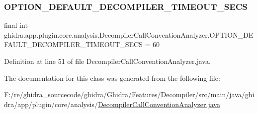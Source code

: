 \subsubsection{\texorpdfstring{OPTION\_DEFAULT\_DECOMPILER\_TIMEOUT\_SECS}{OPTION\_DEFAULT\_DECOMPILER\_TIMEOUT\_SECS}}
{\footnotesize\ttfamily final int ghidra.\+app.\+plugin.\+core.\+analysis.\+Decompiler\+Call\+Convention\+Analyzer.\+O\+P\+T\+I\+O\+N\+\_\+\+D\+E\+F\+A\+U\+L\+T\+\_\+\+D\+E\+C\+O\+M\+P\+I\+L\+E\+R\+\_\+\+T\+I\+M\+E\+O\+U\+T\+\_\+\+S\+E\+CS = 60\hspace{0.3cm}{\ttfamily [static]}}



Definition at line 51 of file Decompiler\+Call\+Convention\+Analyzer.\+java.



The documentation for this class was generated from the following file\+:\begin{DoxyCompactItemize}
\item 
F\+:/re/ghidra\+\_\+sourcecode/ghidra/\+Ghidra/\+Features/\+Decompiler/src/main/java/ghidra/app/plugin/core/analysis/\mbox{\hyperlink{_decompiler_call_convention_analyzer_8java}{Decompiler\+Call\+Convention\+Analyzer.\+java}}\end{DoxyCompactItemize}
